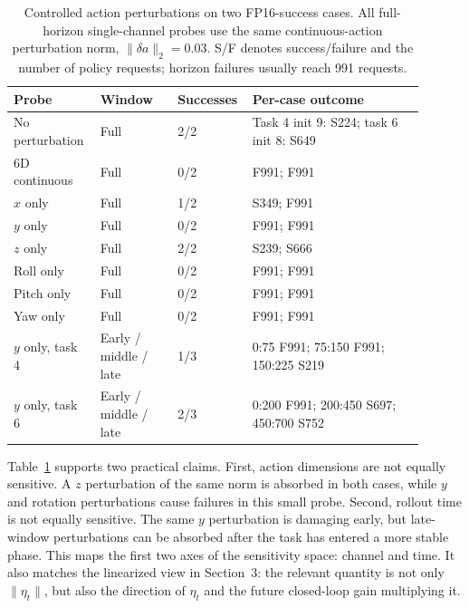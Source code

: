 \documentclass[10pt]{article}
\begin{document}
\begin{table}[H]
\centering
\scriptsize
\setlength{\tabcolsep}{3pt}
\caption{Controlled action perturbations on two FP16-success cases. All full-horizon single-channel probes use the same continuous-action perturbation norm, $\lVert\delta a\rVert_2=0.03$. S/F denotes success/failure and the number of policy requests; horizon failures usually reach 991 requests.}
\label{tab:action-phase-anisotropy}
\begin{tabular}{p{0.20\linewidth}p{0.18\linewidth}p{0.12\linewidth}p{0.40\linewidth}}
\toprule
Probe & Window & Successes & Per-case outcome \\
\midrule
No perturbation & Full & 2/2 & Task 4 init 9: S224; task 6 init 8: S649 \\
6D continuous & Full & 0/2 & F991; F991 \\
$x$ only & Full & 1/2 & S349; F991 \\
$y$ only & Full & 0/2 & F991; F991 \\
$z$ only & Full & 2/2 & S239; S666 \\
Roll only & Full & 0/2 & F991; F991 \\
Pitch only & Full & 0/2 & F991; F991 \\
Yaw only & Full & 0/2 & F991; F991 \\
\midrule
$y$ only, task 4 & Early / middle / late & 1/3 & 0:75 F991; 75:150 F991; 150:225 S219 \\
$y$ only, task 6 & Early / middle / late & 2/3 & 0:200 F991; 200:450 S697; 450:700 S752 \\
\bottomrule
\end{tabular}
\end{table}

Table~\ref{tab:action-phase-anisotropy} supports two practical claims. First, action dimensions are not equally sensitive. A $z$ perturbation of the same norm is absorbed in both cases, while $y$ and rotation perturbations cause failures in this small probe. Second, rollout time is not equally sensitive. The same $y$ perturbation is damaging early, but late-window perturbations can be absorbed after the task has entered a more stable phase. This maps the first two axes of the sensitivity space: channel and time. It also matches the linearized view in Section~3: the relevant quantity is not only $\lVert\eta_t\rVert$, but also the direction of $\eta_t$ and the future closed-loop gain multiplying it.
\end{document}
